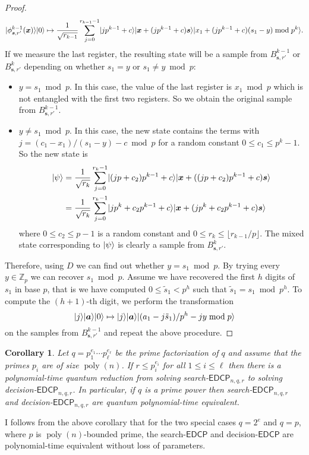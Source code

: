 \documentclass[11pt]{article}
\theoremstyle{plain}
\newtheorem{corollary}[theorem]{Corollary}
\theoremstyle{definition}
\DeclareMathOperator{\poly}{poly}
\DeclarePairedDelimiter{\ldbrac}{\lvert}{\rangle}
\def\Z{\ensuremath{\mathbb{Z}}}
\def\edcp{\ensuremath{\mathsf{EDCP}}}
\begin{document}
\begin{proof}
    \[ \ldbrac{\phi_{\bm{s}, r'}^{k - 1}(\bm{x})}\ldbrac{0} \mapsto \frac{1}{\sqrt{r_{k - 1}}} \sum_{j = 0}^{r_{k - 1} - 1} \ldbrac{jp^{k - 1} + c}\ldbrac{\bm{x} + (jp^{k - 1} + c)\bm{s}}\ldbrac{x_1 + (jp^{k - 1} + c)(s_1 - y) \bmod p^k}. \]
    If we measure the last register, the resulting state will be a sample from $B_{\bm{s}, r'}^{k - 1}$ or $B_{\bm{s}, r'}^k$ depending on whether $s_1 = y$ or $s_1 \ne y \bmod p$:
    \begin{itemize}
    \item $y = s_1 \bmod p$. In this case, the value of the last register is $x_1 \bmod p$ which is not entangled with the first two registers. So we obtain the original sample from $B_{\bm{s}, r'}^{k - 1}$.
    \item $y \ne s_1 \bmod p$. In this case, the new state contains the terms with $j = (c_1 - x_1) / (s_1 - y) - c \bmod p$ for a random constant $0 \le c_1 \le p^k - 1$. So the new state is
    \begin{align*}
        \ldbrac{\psi}
        & = \frac{1}{\sqrt{r_k}} \sum_{j = 0}^{r_k - 1} \ldbrac{(jp + c_2)p^{k - 1} + c}\ldbrac{\bm{x} + ((jp + c_2)p^{k - 1} + c)\bm{s}} \\
        & = \frac{1}{\sqrt{r_k}} \sum_{j = 0}^{r_k - 1} \ldbrac{jp^k + c_2p^{k - 1} + c}\ldbrac{\bm{x} + (jp^k + c_2p^{k - 1} + c)\bm{s}}
    \end{align*}
    where $0 \le c_2 \le p - 1$ is a random constant and $0 \le r_k \le \lfloor r_{k - 1} / p \rfloor$. The mixed state corresponding to $\ldbrac{\psi}$ is clearly a sample from $B_{\bm{s}, r'}^k$.
    \end{itemize}
    Therefore, using $D$ we can find out whether $y = s_1 \bmod p$. By trying every $y \in \Z_p$ we can recover $s_1 \bmod p$. Assume we have recovered the first $h$ digits of $s_1$ in base $p$, that is we have computed $0 \le \tilde{s}_1 < p^h$ such that $\tilde{s}_1 = s_1 \bmod p^h$. To compute the $(h + 1)$-th digit, we perform the transformation
    \[ \ldbrac{j}\ldbrac{\bm{a}}\ldbrac{0} \mapsto \ldbrac{j}\ldbrac{\bm{a}}\ldbrac{(a_1 - j\tilde{s}_1) / p^h - jy \bmod p}  \]
    on the samples from $B_{\bm{s}, r'}^{k - 1}$ and repeat the above procedure.
\end{proof}
\begin{corollary}
    Let $q = p_1^{e_1} \cdots p_\ell^{e_\ell}$ be the prime factorization of $q$ and assume that the primes $p_i$ are of size $\poly(n)$. If $r \le p_i^{e_i}$ for all $1 \le i \le \ell$ then there is a polynomial-time quantum reduction from solving search-$\edcp_{n, q, r}$ to solving decision-$\edcp_{n, q, r}$. In particular, if $q$ is a prime power then search-$\edcp_{n, q, r}$ and decision-$\edcp_{n, q, r}$ are quantum polynomial-time equivalent.
\end{corollary}
I follows from the above corollary that for the two special cases $q = 2^e$ and $q = p$, where $p$ is $\poly(n)$-bounded prime, the search-$\edcp$ and decision-$\edcp$ are polynomial-time equivalent without loss of parameters. 
\end{document}
